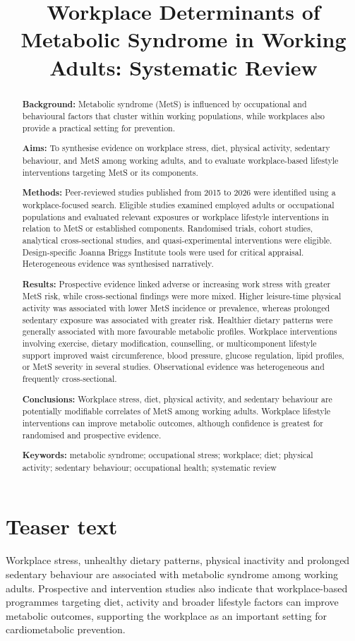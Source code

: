 \documentclass[11pt]{article}
\title{Workplace Determinants of Metabolic Syndrome in Working Adults: Systematic Review}
\author{}
\date{}
\begin{document}
\maketitle

\section*{Teaser text}
Workplace stress, unhealthy dietary patterns, physical inactivity and prolonged sedentary behaviour are associated with metabolic syndrome among working adults. Prospective and intervention studies also indicate that workplace-based programmes targeting diet, activity and broader lifestyle factors can improve metabolic outcomes, supporting the workplace as an important setting for cardiometabolic prevention.

\begin{abstract}
\textbf{Background:}
Metabolic syndrome (MetS) is influenced by occupational and behavioural factors that cluster within working populations, while workplaces also provide a practical setting for prevention.

\textbf{Aims:}
To synthesise evidence on workplace stress, diet, physical activity, sedentary behaviour, and MetS among working adults, and to evaluate workplace-based lifestyle interventions targeting MetS or its components.

\textbf{Methods:}
Peer-reviewed studies published from 2015 to 2026 were identified using a workplace-focused search. Eligible studies examined employed adults or occupational populations and evaluated relevant exposures or workplace lifestyle interventions in relation to MetS or established components. Randomised trials, cohort studies, analytical cross-sectional studies, and quasi-experimental interventions were eligible. Design-specific Joanna Briggs Institute tools were used for critical appraisal. Heterogeneous evidence was synthesised narratively.

\textbf{Results:}
Prospective evidence linked adverse or increasing work stress with greater MetS risk, while cross-sectional findings were more mixed. Higher leisure-time physical activity was associated with lower MetS incidence or prevalence, whereas prolonged sedentary exposure was associated with greater risk. Healthier dietary patterns were generally associated with more favourable metabolic profiles. Workplace interventions involving exercise, dietary modification, counselling, or multicomponent lifestyle support improved waist circumference, blood pressure, glucose regulation, lipid profiles, or MetS severity in several studies. Observational evidence was heterogeneous and frequently cross-sectional.

\textbf{Conclusions:}
Workplace stress, diet, physical activity, and sedentary behaviour are potentially modifiable correlates of MetS among working adults. Workplace lifestyle interventions can improve metabolic outcomes, although confidence is greatest for randomised and prospective evidence.

\textbf{Keywords:} metabolic syndrome; occupational stress; workplace; diet; physical activity; sedentary behaviour; occupational health; systematic review
\end{abstract}
\end{document}
